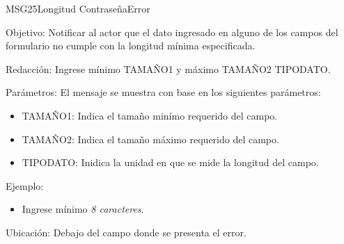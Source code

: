\begin{mensaje}{MSG25}{Longitud Contraseña}{Error}
	\item [Objetivo:] Notificar al actor que el dato ingresado en alguno de los campos del formulario no cumple con la longitud mínima especificada.
	\item[Redacción:] Ingrese mínimo TAMAÑO1 y máximo TAMAÑO2 TIPODATO.
	\item[Parámetros:] El mensaje se muestra con base en los siguientes parámetros:
		\begin{itemize}
 			\item TAMAÑO1: Indica el tamaño minímo requerido del campo.
 			\item TAMAÑO2: Indica el tamaño máximo requerido del campo.
 			\item TIPODATO: Inidica la unidad en que se mide la longitud del campo.
		\end{itemize}
	\item[Ejemplo:] 
	\begin{itemize}
		\item Ingrese mínimo {\em 8 caracteres}.
	\end{itemize}
	\item [Ubicación:] Debajo del campo donde se presenta el error.
\end{mensaje}